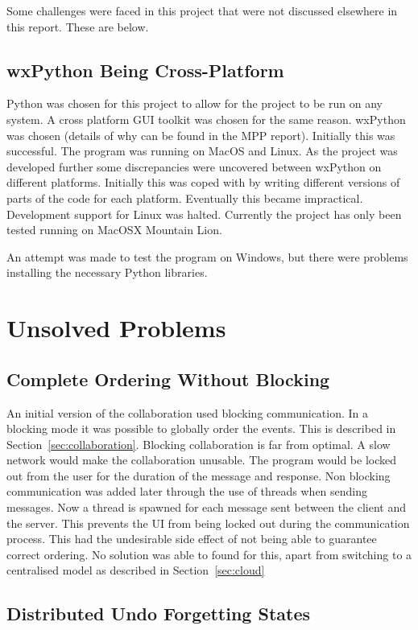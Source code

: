 Some challenges were faced in this project that were not discussed elsewhere in this report.  These are below.

\subsection{wxPython Being Cross-Platform}
Python was chosen for this project to allow for the project to be run on any system.  A cross platform \ac{GUI} toolkit was chosen for the same reason.  wxPython was chosen (details of why can be found in the MPP report).  Initially this was successful.  The program was running on MacOS and Linux.  As the project was developed further some discrepancies were uncovered between wxPython on different platforms.  Initially this was coped with by writing different versions of parts of the code for each platform.  Eventually this became impractical.  Development support for Linux was halted.  Currently the project has only been tested running on MacOSX Mountain Lion.

An attempt was made to test the program on Windows, but there were problems installing the necessary Python libraries.

\section{Unsolved Problems}

\subsection{Complete Ordering Without Blocking}

An initial version of the collaboration used blocking communication.  In a blocking mode it was possible to globally order the events.  This is described in Section~\ref{sec:collaboration}.  Blocking collaboration is far from optimal.  A slow network would make the collaboration unusable.  The program would be locked out from the user for the duration of the message and response.  Non blocking communication was added later through the use of threads when sending messages.  Now a thread is spawned for each message sent between the client and the server.  This prevents the \ac{UI} from being locked out during the communication process.  This had the undesirable side effect of not being able to guarantee correct ordering.  No solution was able to found for this, apart from switching to a centralised model as described in Section~\ref{sec:cloud}

\subsection{Distributed Undo Forgetting States}

